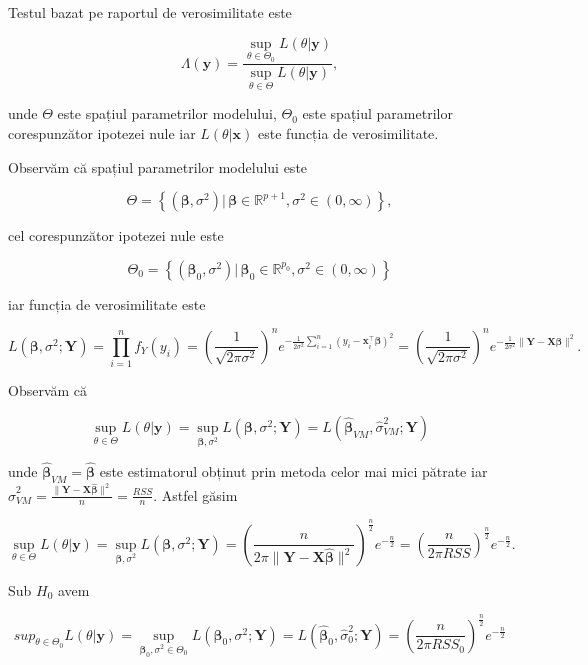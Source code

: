 \documentclass[]{article}
\begin{document}
Testul bazat pe raportul de verosimilitate este

\[
  \Lambda(\mathbf{y})=\frac{\sup_{\theta\in\Theta_0}L(\theta|\mathbf{y})}{\sup_{\theta\in\Theta}L(\theta|\mathbf{y})},
\]

unde \(\Theta\) este spațiul parametrilor modelului, \(\Theta_0\) este
spațiul parametrilor corespunzător ipotezei nule iar
\(L(\theta|\mathbf{x})\) este funcția de verosimilitate.

Observăm că spațiul parametrilor modelului este

\[
\Theta = \left\{(\boldsymbol \beta, \sigma^2)|\,\boldsymbol \beta\in\mathbb{R}^{p+1}, \sigma^2\in (0,\infty)\right\},
\]

cel corespunzător ipotezei nule este

\[
\Theta_0 = \left\{(\boldsymbol \beta_0, \sigma^2)|\,\boldsymbol \beta_0\in\mathbb{R}^{p_0}, \sigma^2\in (0,\infty)\right\}
\]

iar funcția de verosimilitate este

\[
 L(\boldsymbol\beta, \sigma^2;\boldsymbol Y) = \prod_{i = 1}^{n}f_{Y}(y_i) = \left(\frac{1}{\sqrt{2\pi\sigma^2}}\right)^n e^{-\frac{1}{2\sigma^2}\sum_{i = 1}^{n}(y_i - \boldsymbol x_i^\intercal\boldsymbol\beta)^2} = \left(\frac{1}{\sqrt{2\pi\sigma^2}}\right)^n e^{-\frac{1}{2\sigma^2}\lVert\boldsymbol Y - \boldsymbol X\boldsymbol\beta\rVert^2}.
\]

Observăm că

\[
\sup_{\theta\in\Theta}L(\theta|\mathbf{y}) = \sup_{\boldsymbol\beta, \sigma^2} L(\boldsymbol\beta, \sigma^2;\boldsymbol Y) = L(\hat{\boldsymbol\beta}_{VM}, \hat{\sigma}^2_{VM};\boldsymbol Y)
\]

unde \(\hat{\boldsymbol\beta}_{VM}=\hat{\boldsymbol\beta}\) este
estimatorul obținut prin metoda celor mai mici pătrate iar
\(\hat{\sigma}^2_{VM} = \frac{\lVert\boldsymbol Y - \boldsymbol X\hat{\boldsymbol\beta}\rVert^2}{n} = \frac{RSS}{n}\).
Astfel găsim

\[
\sup_{\theta\in\Theta}L(\theta|\mathbf{y}) = \sup_{\boldsymbol\beta, \sigma^2} L(\boldsymbol\beta, \sigma^2;\boldsymbol Y) = \left(\frac{n}{2\pi\lVert\boldsymbol Y - \boldsymbol X\hat{\boldsymbol\beta}\rVert^2}\right)^{\frac{n}{2}}e^{-\frac{n}{2}} = \left(\frac{n}{2\pi RSS}\right)^{\frac{n}{2}}e^{-\frac{n}{2}}.
\]

Sub \(H_0\) avem

\[
sup_{\theta\in\Theta_0}L(\theta|\mathbf{y}) = \sup_{\boldsymbol\beta_0, \sigma^2\in\Theta_0} L(\boldsymbol\beta_0, \sigma^2;\boldsymbol Y) = L(\hat{\boldsymbol\beta}_{0}, \hat{\sigma}^2_{0};\boldsymbol Y) = \left(\frac{n}{2\pi RSS_{0}}\right)^{\frac{n}{2}}e^{-\frac{n}{2}}
\]
\end{document}
